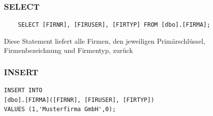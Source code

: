 \documentclass[a4paper,10pt]{scrartcl}
\begin{document}
\subsubsection{SELECT}
\begin{verbatim}
    SELECT [FIRNR], [FIRUSER], [FIRTYP] FROM [dbo].[FIRMA];
\end{verbatim}
Diese Statement liefert alle Firmen, den jeweiligen Primärschlüssel, Firmenbezeichnung und Firmentyp, zurück
\subsubsection{INSERT}
\begin{verbatim}
INSERT INTO 
[dbo].[FIRMA]([FIRNR], [FIRUSER], [FIRTYP]) 
VALUES (1,'Musterfirma GmbH',0);
\end{verbatim}
\end{document}
